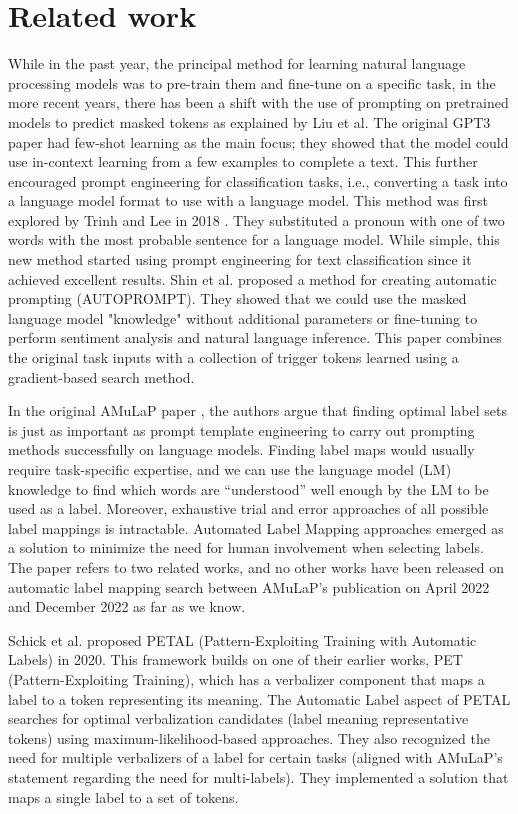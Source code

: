\section{Related work}\label{sec:related}

While in the past year, the principal method for learning natural language processing models was to pre-train them and fine-tune on a specific task, in the more recent years, there has been a shift with the use of prompting on pretrained models to predict masked tokens as explained by Liu et al. \cite{Liu} The original GPT3 paper \cite{GPT3} had few-shot learning as the main focus; they showed that the model could use in-context learning from a few examples to complete a text. This further encouraged prompt engineering for classification tasks, i.e., converting a task into a language model format to use with a language model. This method was first explored by Trinh and Lee in 2018 \cite{Trinh}. They substituted a pronoun with one of two words with the most probable sentence for a language model. While simple, this new method started using prompt engineering for text classification since it achieved excellent results. Shin et al. \cite{Shin} proposed a method for creating automatic prompting (AUTOPROMPT). They showed that we could use the masked language model "knowledge" without additional parameters or fine-tuning to perform sentiment analysis and natural language inference. This paper combines the original task inputs with a collection of trigger tokens learned using a gradient-based search method.

\hfill \break
In the original AMuLaP paper \cite{Wang}, the authors argue that finding optimal label sets is just as important as prompt template engineering to carry out prompting methods successfully on language models. Finding label maps would usually require task-specific expertise, and we can use the language model (LM) knowledge to find which words are ``understood'' well enough by the LM to be used as a label. Moreover, exhaustive trial and error approaches of all possible label mappings is intractable\cite{gao-etal-2021-making}. Automated Label Mapping approaches emerged as a solution to minimize the need for human involvement when selecting labels. The paper refers to two related works, and no other works have been released on automatic label mapping search between AMuLaP's publication on April 2022 and December 2022 as far as we know.

\hfill \break
Schick et al. \cite{schick2020automatically} proposed PETAL (Pattern-Exploiting Training with Automatic Labels) in 2020. This framework builds on one of their earlier works, PET (Pattern-Exploiting Training), which has a verbalizer component that maps a label to a token representing its meaning. The Automatic Label aspect of PETAL searches for optimal verbalization candidates (label meaning representative tokens) using maximum-likelihood-based approaches. They also recognized the need for multiple verbalizers of a label for certain tasks (aligned with AMuLaP's statement regarding the need for multi-labels). They implemented a solution that maps a single label to a set of tokens.

